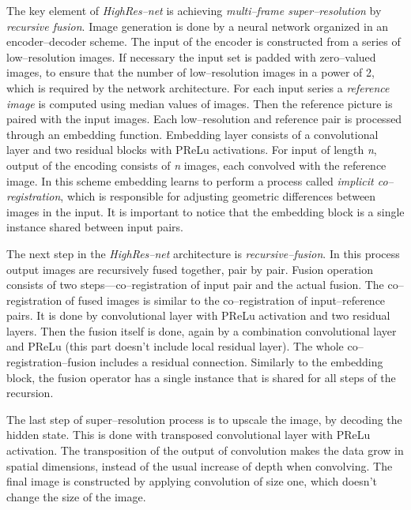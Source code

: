 The key element of \textit{HighRes--net} is achieving \textit{multi--frame super--resolution} by \textit{recursive fusion}.
Image generation is done by a neural network organized in an encoder--decoder scheme.
The input of the encoder is constructed from a series of low--resolution images.
If necessary the input set is padded with zero--valued images, to ensure that the number of low--resolution images in a power of 2, which is required by the network architecture.
For each input series a \textit{reference image} is computed using median values of images.
Then the reference picture is paired with the input images.
Each low--resolution and reference pair is processed through an embedding function.
Embedding layer consists of a convolutional layer and two residual blocks with PReLu activations.
For input of length \textit{n}, output of the encoding consists of \textit{n} images, each convolved with the reference image.
In this scheme embedding learns to perform a process called \textit{implicit co--registration}, which is responsible for adjusting geometric differences between images in the input.
It is important to notice that the embedding block is a single instance shared between input pairs.

The next step in the \textit{HighRes--net} architecture is \textit{recursive--fusion}.
In this process output images are recursively fused together, pair by pair.
Fusion operation consists of two steps---co--registration of input pair and the actual fusion.
The co--registration of fused images is similar to the co--registration of input--reference pairs.
It is done by convolutional layer with PReLu activation and two residual layers.
Then the fusion itself is done, again by a combination convolutional layer and PReLu (this part doesn't include local residual layer).
The whole co--registration--fusion includes a residual connection.
Similarly to the embedding block, the fusion operator has a single instance that is shared for all steps of the recursion.

The last step of super--resolution process is to upscale the image, by decoding the hidden state.
This is done with transposed convolutional layer with PReLu activation.
The transposition of the output of convolution makes the data grow in spatial dimensions, instead of the usual increase of depth when convolving.
The final image is constructed by applying convolution of size one, which doesn't change the size of the image.

